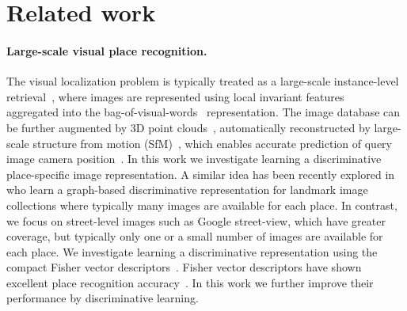 \documentclass[10pt,twocolumn,letterpaper]{article}
\begin{document}
\section{Related work} 
\label{sec:related}

\paragraph{Large-scale visual place recognition.} %
    The visual localization problem is typically treated as a large-scale instance-level retrieval~\cite{Cummins09,Chen11,Gronat13,Knopp2010,Schindler07,Torii2013,Zamir10}, where images are represented using local invariant features~\cite{Lowe04} aggregated into the bag-of-visual-words~\cite{Csurka04,Sivic03} representation. The image database can be further augmented by 3D point clouds~\cite{Klinger13}, automatically reconstructed by large-scale structure from motion (SfM)~\cite{Agarwal-ICCV-2009,Klinger13}, which enables accurate prediction of query image camera position~\cite{Li12,Sattler12}. 
     In this work we investigate learning a discriminative place-specific image representation. A similar idea has been recently explored in~\cite{Cao13} 
    who learn a graph-based discriminative representation for landmark image collections where typically many images are available for each place.
    In contrast, we focus on street-level images such as Google street-view, which have greater coverage, but typically only one or a small number of images are  available for each place.  
     We investigate learning a discriminative representation using the compact Fisher vector descriptors~\cite{Jegou12}. Fisher vector descriptors have shown excellent place recognition accuracy~\cite{Torii2013}. In this work we further improve their performance by discriminative learning.
\end{document}
